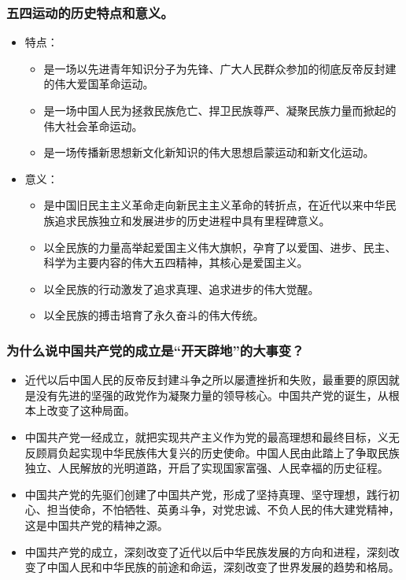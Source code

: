 \documentclass{article}
\begin{document}
\subsubsection{五四运动的历史特点和意义。}
\begin{itemize}
    \item 特点：
    \begin{itemize}
        \item 是一场以先进青年知识分子为先锋、广大人民群众参加的彻底反帝反封建的伟大爱国革命运动。
        \item 是一场中国人民为拯救民族危亡、捍卫民族尊严、凝聚民族力量而掀起的伟大社会革命运动。
        \item 是一场传播新思想新文化新知识的伟大思想启蒙运动和新文化运动。
    \end{itemize}
    \item 意义：
    \begin{itemize}
        \item 是中国旧民主主义革命走向新民主主义革命的转折点，在近代以来中华民族追求民族独立和发展进步的历史进程中具有里程碑意义。
        \item 以全民族的力量高举起爱国主义伟大旗帜，孕育了以爱国、进步、民主、科学为主要内容的伟大五四精神，其核心是爱国主义。
        \item 以全民族的行动激发了追求真理、追求进步的伟大觉醒。
        \item 以全民族的搏击培育了永久奋斗的伟大传统。
    \end{itemize}
\end{itemize}

\subsubsection{为什么说中国共产党的成立是“开天辟地”的大事变？}
\begin{itemize}
    \item 近代以后中国人民的反帝反封建斗争之所以屡遭挫折和失败，最重要的原因就是没有先进的坚强的政党作为凝聚力量的领导核心。中国共产党的诞生，从根本上改变了这种局面。
    \item 中国共产党一经成立，就把实现共产主义作为党的最高理想和最终目标，义无反顾肩负起实现中华民族伟大复兴的历史使命。中国人民由此踏上了争取民族独立、人民解放的光明道路，开启了实现国家富强、人民幸福的历史征程。
    \item 中国共产党的先驱们创建了中国共产党，形成了坚持真理、坚守理想，践行初心、担当使命，不怕牺牲、英勇斗争，对党忠诚、不负人民的伟大建党精神，这是中国共产党的精神之源。
    \item 中国共产党的成立，深刻改变了近代以后中华民族发展的方向和进程，深刻改变了中国人民和中华民族的前途和命运，深刻改变了世界发展的趋势和格局。
\end{itemize}
    
\end{document}
